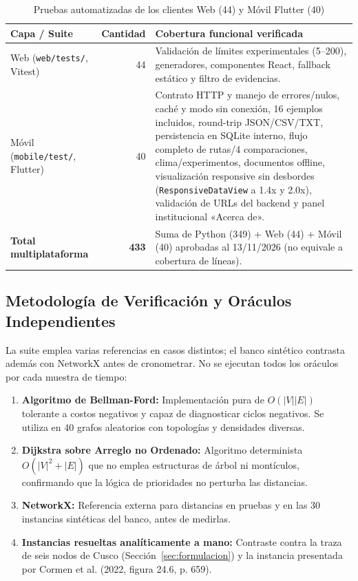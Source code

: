 \begin{table}[H]
    \centering
    \fontsize{9}{11}\selectfont
    \renewcommand{\arraystretch}{1.12}
    \caption{Pruebas automatizadas de los clientes Web (44) y Móvil Flutter (40)}
    \label{tab:suite_multiplataforma}
    \begin{tabularx}{\textwidth}{@{}>{\raggedright\arraybackslash}p{4.8cm} r >{\raggedright\arraybackslash}X@{}}
        \toprule
        \textbf{Capa / Suite} & \textbf{Cantidad} & \textbf{Cobertura funcional verificada} \\
        \midrule
        Web (\texttt{web/tests/}, Vitest) & 44 & Validación de límites experimentales (5--200), generadores, componentes React, fallback estático y filtro de evidencias. \\
        Móvil (\texttt{mobile/test/}, Flutter) & 40 & Contrato HTTP y manejo de errores/nulos, caché y modo sin conexión, 16 ejemplos incluidos, round-trip JSON/CSV/TXT, persistencia en SQLite interno, flujo completo de rutas/4 comparaciones, clima/experimentos, documentos offline, visualización responsive sin desbordes (\texttt{ResponsiveDataView} a 1.4x y 2.0x), validación de URLs del backend y panel institucional «Acerca de». \\
        \midrule
        \textbf{Total multiplataforma} & \textbf{433} & Suma de Python (349) + Web (44) + Móvil (40) aprobadas al 13/11/2026 (no equivale a cobertura de líneas). \\
        \bottomrule
    \end{tabularx}
\end{table}

\subsection{Metodología de Verificación y Oráculos Independientes}
La suite emplea varias referencias en casos distintos; el banco sintético contrasta además con NetworkX antes de cronometrar. No se ejecutan todos los oráculos por cada muestra de tiempo:
\begin{enumerate}
    \item \textbf{Algoritmo de Bellman-Ford:} Implementación pura de $O(|V||E|)$ tolerante a costos negativos y capaz de diagnosticar ciclos negativos. Se utiliza en 40 grafos aleatorios con topologías y densidades diversas.
    \item \textbf{Dijkstra sobre Arreglo no Ordenado:} Algoritmo determinista $O(|V|^2+|E|)$ que no emplea estructuras de árbol ni montículos, confirmando que la lógica de prioridades no perturba las distancias.
    \item \textbf{NetworkX:} Referencia externa para distancias en pruebas y en las 30 instancias sintéticas del banco, antes de medirlas.
    \item \textbf{Instancias resueltas analíticamente a mano:} Contraste contra la traza de seis nodos de Cusco (Sección~\ref{sec:formulacion}) y la instancia presentada por Cormen et al. (2022, figura 24.6, p. 659).
\end{enumerate}


